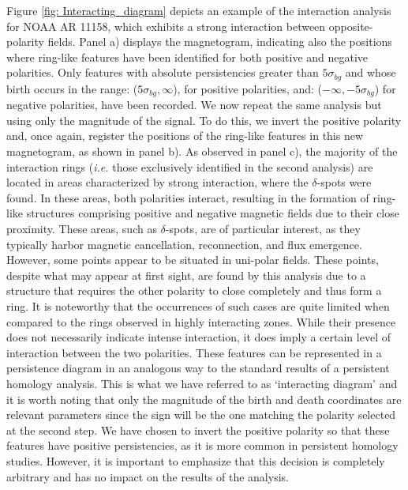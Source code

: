 \documentclass[12pt]{mythesis}
\begin{document}
Figure \ref{fig: Interacting_diagram} depicts an example of the interaction analysis for NOAA AR 11158, which exhibits a strong interaction between opposite-polarity fields. Panel a) displays the magnetogram, indicating also the positions where ring-like features have been identified for both positive and negative polarities. Only features with absolute persistencies greater than $5\sigma _ {bg}$ and whose birth occurs in the range: ($5\sigma _ {bg}, \infty$), for positive polarities, and: ($-\infty, -5\sigma _ {bg}$) for negative polarities, have been recorded. We now repeat the same analysis but using only the magnitude of the signal. To do this, we invert the positive polarity and, once again, register the positions of the ring-like features in this new magnetogram, as shown in panel b). As observed in panel c), the majority of the interaction rings (\textit{i.e.} those exclusively identified in the second analysis) are located in areas characterized by strong interaction, where the $\delta$-spots were found. In these areas, both polarities interact, resulting in the formation of ring-like structures comprising positive and negative magnetic fields due to their close proximity. These areas, such as  $\delta$-spots, are of particular interest, as they typically harbor magnetic cancellation, reconnection, and flux emergence.  However, some points appear to be situated in uni-polar fields. These points, despite what may appear at first sight, are found by this analysis due to a structure that requires the other polarity to close completely and thus form a ring. It is noteworthy that the occurrences of such cases are quite limited when compared to the rings observed in highly interacting zones. While their presence does not necessarily indicate intense interaction, it does imply a certain level of interaction between the two polarities. These features can be represented in a persistence diagram in an analogous way to the standard results of a persistent homology analysis. This is what we have referred to as `interacting diagram' and it is worth noting that only the magnitude of the birth and death coordinates are relevant parameters since the sign will be the one matching the polarity selected at the second step. We have chosen to invert the positive polarity so that these features have positive persistencies, as it is more common in persistent homology studies. However, it is important to emphasize that this decision is completely arbitrary and has no impact on the results of the analysis.  
\end{document}
